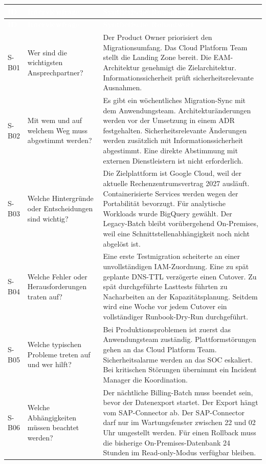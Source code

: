 \documentclass[
  10pt,
  ngerman,
  a4paper,
  toc=graduated,
  numbers=noenddot,
  headings=standardclasses,
  nonumberlist
]{scrartcl}
\begin{document}
\footnotesize
\begin{longtable}{L{1.0cm}L{4.2cm}L{9.8cm}}
\toprule
{}
\textcolor{white}{\textbf{ID}} & \textcolor{white}{\textbf{Interviewfrage}} & \textcolor{white}{\textbf{Synthetische Rohantwort}}\\
\midrule
\endfirsthead
\toprule
{}
\textcolor{white}{\textbf{ID}} & \textcolor{white}{\textbf{Interviewfrage}} & \textcolor{white}{\textbf{Synthetische Rohantwort}}\\
\midrule
\endhead
S-B01 & Wer sind die wichtigsten Ansprechpartner? & Der Product Owner priorisiert den Migrationsumfang. Das Cloud Platform Team stellt die Landing Zone bereit. Die EAM-Architektur genehmigt die Zielarchitektur. Informationssicherheit prüft sicherheitsrelevante Ausnahmen.\\
S-B02 & Mit wem und auf welchem Weg muss abgestimmt werden? & Es gibt ein wöchentliches Migration-Sync mit dem Anwendungsteam. Architekturänderungen werden vor der Umsetzung in einem ADR festgehalten. Sicherheitsrelevante Änderungen werden zusätzlich mit Informationssicherheit abgestimmt. Eine direkte Abstimmung mit externen Dienstleistern ist nicht erforderlich.\\
S-B03 & Welche Hintergründe oder Entscheidungen sind wichtig? & Die Zielplattform ist Google Cloud, weil der aktuelle Rechenzentrumsvertrag 2027 ausläuft. Containerisierte Services werden wegen der Portabilität bevorzugt. Für analytische Workloads wurde BigQuery gewählt. Der Legacy-Batch bleibt vorübergehend On-Premises, weil eine Schnittstellenabhängigkeit noch nicht abgelöst ist.\\
S-B04 & Welche Fehler oder Herausforderungen traten auf? & Eine erste Testmigration scheiterte an einer unvollständigen IAM-Zuordnung. Eine zu spät geplante DNS-TTL verzögerte einen Cutover. Zu spät durchgeführte Lasttests führten zu Nacharbeiten an der Kapazitätsplanung. Seitdem wird eine Woche vor jedem Cutover ein vollständiger Runbook-Dry-Run durchgeführt.\\
S-B05 & Welche typischen Probleme treten auf und wer hilft? & Bei Produktionsproblemen ist zuerst das Anwendungsteam zuständig. Plattformstörungen gehen an das Cloud Platform Team. Sicherheitsalarme werden an das SOC eskaliert. Bei kritischen Störungen übernimmt ein Incident Manager die Koordination.\\
S-B06 & Welche Abhängigkeiten müssen beachtet werden? & Der nächtliche Billing-Batch muss beendet sein, bevor der Datenexport startet. Der Export hängt vom SAP-Connector ab. Der SAP-Connector darf nur im Wartungsfenster zwischen 22 und 02 Uhr umgestellt werden. Für einen Rollback muss die bisherige On-Premises-Datenbank 24 Stunden im Read-only-Modus verfügbar bleiben.\\

\end{longtable}
\end{document}
